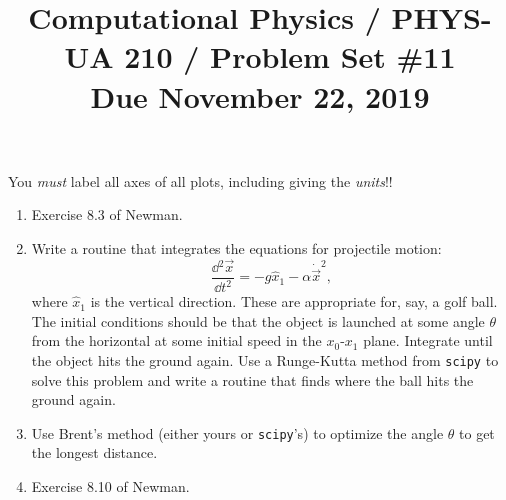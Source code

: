 \documentclass[11pt, preprint]{aastex}
\begin{document}
\title{\bf Computational Physics / PHYS-UA 210 / Problem Set \#11
\\ Due November 22, 2019}

You {\it must} label all axes of all plots, including giving the {\it
  units}!!

\begin{enumerate}
  \item Exercise 8.3 of Newman.

\item Write a routine that integrates the equations for projectile
  motion:
  \begin{equation}
    \frac{\dd{^2\vec{x}}}{\dd{t}^2} = - g {\hat x}_1 - \alpha
    \dot{\vec{x}}^2,
  \end{equation}
  where ${\hat x}_1$ is the vertical direction.
  These are appropriate for, say, a golf ball. 
  The initial conditions should be that the object is launched at some
  angle $\theta$ from the horizontal at some initial speed in the
  $x_0$-$x_1$ plane. Integrate until the object hits the ground
  again. Use a Runge-Kutta method
  from {\tt scipy} to solve this problem and write a routine that
  finds where the ball hits the ground again.
\item Use Brent's method (either yours or {\tt scipy}'s) to optimize
  the angle $\theta$ to get the longest distance.

  \item Exercise 8.10 of Newman.
\end{enumerate}
\end{document}
